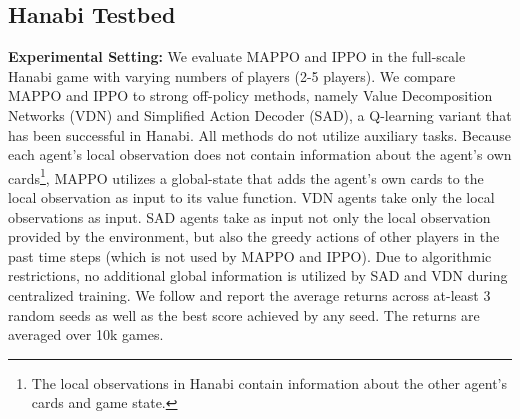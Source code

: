 \documentclass{article}
\theoremstyle{plain}
\theoremstyle{definition}
\theoremstyle{remark}
\begin{document}



\subsection{Hanabi Testbed} 
\textbf{Experimental Setting:} We evaluate MAPPO and IPPO in the full-scale Hanabi game with varying numbers of players (2-5 players). We compare MAPPO and IPPO to strong off-policy methods, namely Value Decomposition Networks (VDN) and Simplified Action Decoder (SAD), a Q-learning variant that has been successful in Hanabi. All methods do not utilize auxiliary tasks. Because each agent's local observation does not contain information about the agent's own cards\footnote{The local observations in Hanabi contain information about the other agent's cards and game state.}, MAPPO utilizes a global-state that adds the agent's own cards to the local observation as input to its value function. VDN agents take only the local observations as input. SAD agents take as input not only the local observation provided by the environment, but also the greedy actions of other players in the past time steps (which is not used by MAPPO and IPPO). Due to algorithmic restrictions, no additional global information is utilized by SAD and VDN during centralized training. We follow \citep{hu2019simplified} and report the average returns across at-least 3 random seeds as well as the best score achieved by any seed. The returns are averaged over 10k games.
\end{document}
